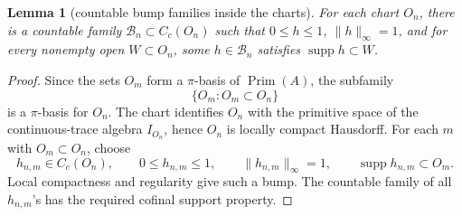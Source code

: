 \documentclass[11pt]{article}
\newtheorem{lemma}{Lemma}
\newcommand{\Prim}{\operatorname{Prim}}
\newcommand{\supp}{\operatorname{supp}}
\begin{document}
\begin{lemma}[countable bump families inside the charts]
\label{lem:bumps}
For each chart \(O_n\), there is a countable family
\(\mathcal B_n\subset C_c(O_n)\) such that \(0\le h\le1\),
\(\|h\|_\infty=1\), and for every nonempty open \(W\subset O_n\), some
\(h\in\mathcal B_n\) satisfies \(\supp h\subset W\).
\end{lemma}

\begin{proof}
Since the sets \(O_m\) form a \(\pi\)-basis of \(\Prim(A)\), the subfamily
\[
        \{O_m:O_m\subset O_n\}
\]
is a \(\pi\)-basis for \(O_n\).  The chart identifies \(O_n\) with the
primitive space of the continuous-trace algebra \(I_{O_n}\), hence \(O_n\) is
locally compact Hausdorff.  For each \(m\) with \(O_m\subset O_n\), choose
\[
        h_{n,m}\in C_c(O_n),\qquad
        0\le h_{n,m}\le1,\qquad
        \|h_{n,m}\|_\infty=1,\qquad
        \supp h_{n,m}\subset O_m.
\]
Local compactness and regularity give such a bump.  The countable family of
all \(h_{n,m}\)'s has the required cofinal support property.
\end{proof}
\end{document}
